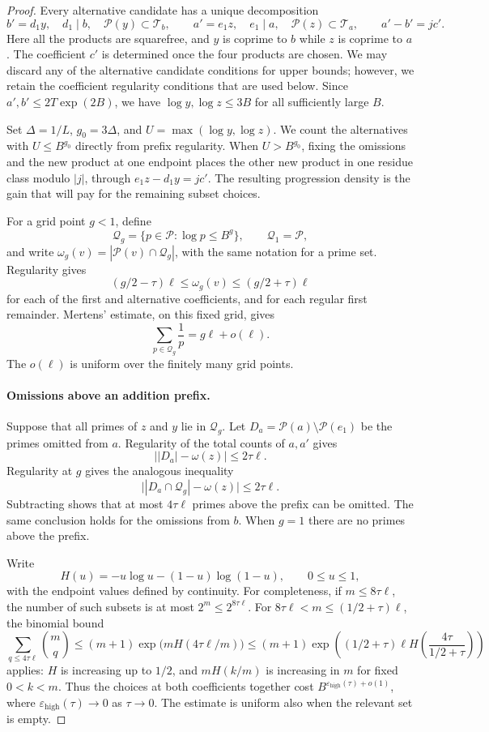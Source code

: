 \begin{proof}
Every alternative candidate has a unique decomposition
\[
 b'=d_1y,\quad d_1\mid b,\quad\mathcal P(y)\subset\mathcal T_b,
 \qquad
 a'=e_1z,\quad e_1\mid a,\quad\mathcal P(z)\subset\mathcal T_a,
 \qquad a'-b'=jc'.
\]
Here all the products are squarefree, and $y$ is coprime to $b$ while
$z$ is coprime to $a$.  The coefficient $c'$ is determined once the
four products are chosen.  We may discard any of the alternative
candidate conditions for upper bounds; however, we retain the
coefficient regularity conditions that are used below.  Since
$a',b'\le2T\exp(2B)$, we have $\log y,\log z\le3B$ for all sufficiently
large $B$.

Set $\Delta=1/L$, $g_0=3\Delta$, and
$U=\max(\log y,\log z)$. We count the alternatives with
$U\le B^{g_0}$ directly from prefix regularity. When $U>B^{g_0}$,
fixing the omissions and the new product at one endpoint places the
other new product in one residue class modulo $|j|$, through
$e_1z-d_1y=jc'$. The resulting progression density is the gain that
will pay for the remaining subset choices.

For a grid point $g<1$, define
\[
 \mathcal Q_g=\{p\in\mathcal P:\log p\le B^g\},
 \qquad \mathcal Q_1=\mathcal P,
\]
and write $\omega_g(v)=|\mathcal P(v)\cap\mathcal Q_g|$, with the
same notation for a prime set.  Regularity gives
\[
 (g/2-\tau)\ell\le\omega_g(v)\le(g/2+\tau)\ell
\]
for each of the first and alternative coefficients, and for each
regular first remainder.  Mertens' estimate, on this fixed grid, gives
\[
 \sum_{p\in\mathcal Q_g}\frac1p=g\ell+o(\ell).
\]
The $o(\ell)$ is uniform over the finitely many grid points.

\paragraph{Omissions above an addition prefix.}
Suppose that all primes of $z$ and $y$ lie in $\mathcal Q_g$.
Let $D_a=\mathcal P(a)\setminus\mathcal P(e_1)$ be the primes omitted
from $a$.  Regularity of the total counts of $a,a'$ gives
\[
 \bigl||D_a|-\omega(z)\bigr|\le2\tau\ell.
\]
Regularity at $g$ gives the analogous inequality
\[
 \bigl||D_a\cap\mathcal Q_g|-\omega(z)\bigr|\le2\tau\ell.
\]
Subtracting shows that at most $4\tau\ell$ primes above the prefix
can be omitted.  The same conclusion holds for the omissions from $b$.
When $g=1$ there are no primes above the prefix.

Write
\[
 H(u)=-u\log u-(1-u)\log(1-u),\qquad 0\le u\le1,
\]
with the endpoint values defined by continuity.
For completeness, if $m\le8\tau\ell$, the number of such subsets is
at most $2^m\le2^{8\tau\ell}$.  For
$8\tau\ell<m\le(1/2+\tau)\ell$, the binomial bound
\[
 \sum_{q\le4\tau\ell}\binom mq
 \le (m+1)\exp\bigl(mH(4\tau\ell/m)\bigr)
 \le (m+1)\exp\left((1/2+\tau)\ell
                 H\left(\frac{4\tau}{1/2+\tau}\right)\right)
\]
applies: $H$ is increasing up to $1/2$, and $mH(k/m)$ is increasing
in $m$ for fixed $0<k<m$.  Thus the choices at both coefficients
together cost $B^{\varepsilon_{\mathrm{high}}(\tau)+o(1)}$, where
$\varepsilon_{\mathrm{high}}(\tau)\to0$ as $\tau\to0$.
The estimate is uniform also when the relevant set is empty.


\end{proof}
